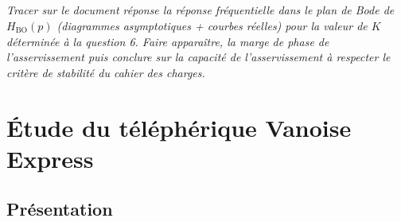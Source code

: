 \documentclass[10pt,fleqn]{article} %
\begin{document}
\subparagraph{}
\textit{Tracer sur le document réponse la réponse fréquentielle dans le plan de Bode de $H_{\text{BO}}(p)$ (diagrammes asymptotiques + courbes réelles) pour la valeur de $K $ déterminée à la question 6. Faire apparaître, la marge de phase de l’asservissement puis conclure sur la capacité de l’asservissement à respecter le critère de stabilité du cahier des charges.}




\section{Étude du téléphérique Vanoise Express}
\subsection{Présentation}
\end{document}
